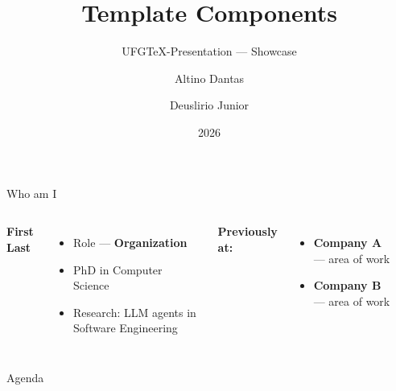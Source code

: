 \documentclass[aspectratio=169,t,xcolor=table]{beamer}
\begin{document}
\title[UFGTeX]{Template Components}
\subtitle{UFGTeX-Presentation — Showcase}
\author{Altino Dantas \and Deuslirio Junior}
\date{2026}

\frame[noframenumbering]{\titlepage}

\begin{frame}{Who am I}

    \begin{columns}
        \textbf{First Last}
        \begin{itemize}
            \item Role — \textbf{Organization}
            \item PhD in Computer Science
            \item Research: LLM agents in Software Engineering
        \end{itemize}

        \vspace{0.5em}
        \textbf{Previously at:}
        \begin{itemize}
            \item \textbf{Company A} — area of work
            \item \textbf{Company B} — area of work
        \end{itemize}

        \begin{center}
        \end{center}
    \end{columns}

\end{frame}

\begin{frame}{Agenda}
    \tableofcontents
\end{frame}
\end{document}
